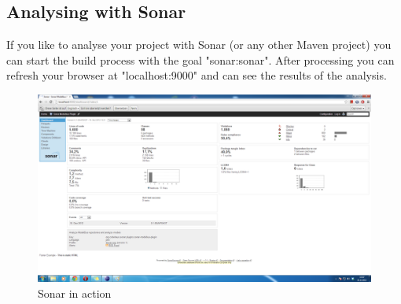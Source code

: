 \subsection{Analysing with Sonar}
If you like to analyse your project with Sonar (or any other Maven project) you can start the build process with the goal "sonar:sonar". After processing you can refresh your browser at "localhost:9000" and can see the results of the analysis.

\begin{figure}[h]
	\centering
		\includegraphics[width=\textwidth]{sonarinaction}
	\caption{Sonar in action}
	\label{fig:sonarinaction}
\end{figure}